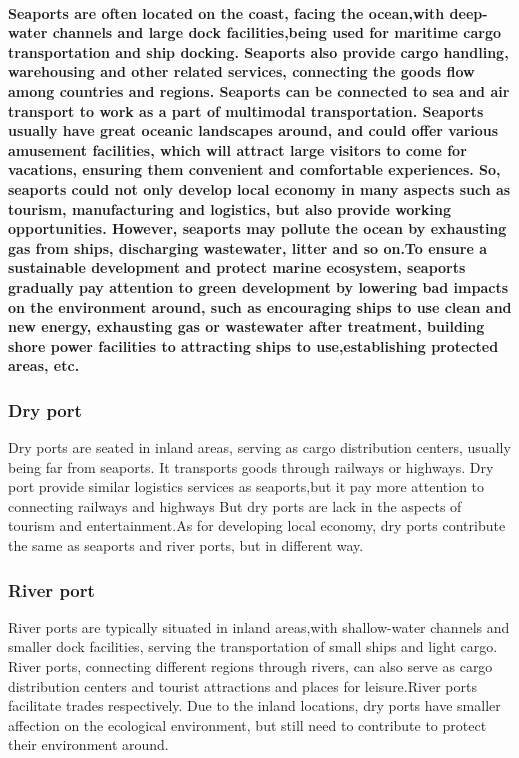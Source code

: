 \documentclass[preprint]{elsarticle}
\begin{document}
 \paragraph{Seaports are often located on the coast, facing the ocean,with deep-water channels and large dock facilities,being used for maritime cargo transportation and ship docking. Seaports also provide cargo handling, warehousing and other related services, connecting the goods flow among countries and regions. Seaports can be connected to sea and air transport to work as a part of multimodal transportation. Seaports usually have great oceanic landscapes around, and could offer various amusement facilities, which will attract large visitors to come for vacations, ensuring them convenient and comfortable experiences. So, seaports could not only develop local economy in many aspects such as tourism, manufacturing and logistics, but also provide working opportunities. However, seaports may pollute the ocean by exhausting gas from ships, discharging wastewater, litter and so on.To ensure a sustainable development and protect marine ecosystem, seaports gradually pay attention to green development by lowering bad impacts on the environment around, such as encouraging ships to use clean and new energy, exhausting gas or wastewater after treatment,  building shore power facilities to attracting ships to use,establishing protected areas, etc.}
 
 \subsubsection{Dry port}Dry ports are seated in inland areas, serving as cargo distribution centers, usually being far from seaports. It transports goods through railways or highways. Dry port provide similar logistics services as seaports,but it pay more attention to connecting railways and highways
But dry ports are lack in the aspects of tourism and entertainment.As for developing local economy, dry ports contribute the same as seaports and river ports, but in different way. 

 \subsubsection{River port}River ports are typically situated in inland areas,with shallow-water channels and smaller dock facilities, serving the transportation of small ships and light cargo. River ports, connecting different regions through rivers, can also serve as cargo distribution centers and tourist attractions and places for leisure.River ports facilitate trades respectively. Due to the inland locations, dry ports have smaller affection on the ecological environment, but still need to contribute to protect their environment around.
\end{document}
